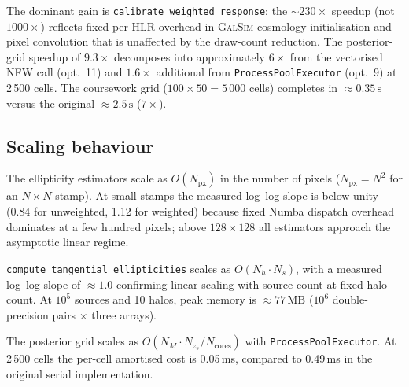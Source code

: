 The dominant gain is \texttt{calibrate\_weighted\_response}: the ${\sim}230\times$
speedup (not $1000\times$) reflects fixed per-HLR overhead in \textsc{GalSim}
cosmology initialisation and pixel convolution that is unaffected by the draw-count
reduction. The posterior-grid speedup of $9.3\times$ decomposes into approximately
$6\times$ from the vectorised NFW call (opt.~11) and $1.6\times$ additional from
\texttt{ProcessPoolExecutor} (opt.~9) at 2\,500 cells. The coursework grid
($100 \times 50 = 5\,000$ cells) completes in ${\approx}0.35\,\mathrm{s}$
versus the original ${\approx}2.5\,\mathrm{s}$ ($7\times$).

\subsection{Scaling behaviour}

The ellipticity estimators scale as $O(N_\mathrm{px})$ in the number of pixels
($N_\mathrm{px} = N^2$ for an $N\times N$ stamp). At small stamps the measured
log--log slope is below unity (0.84 for unweighted, 1.12 for weighted) because
fixed Numba dispatch overhead dominates at a few hundred pixels; above
$128\times128$ all estimators approach the asymptotic linear regime.

\texttt{compute\_tangential\_ellipticities} scales as $O(N_h \cdot N_s)$, with
a measured log--log slope of ${\approx}1.0$ confirming linear scaling with
source count at fixed halo count. At $10^5$ sources and 10 halos, peak
memory is ${\approx}77\,\mathrm{MB}$ ($10^6$ double-precision pairs $\times$
three arrays).

The posterior grid scales as $O(N_M \cdot N_{z_s} / N_\mathrm{cores})$ with
\texttt{ProcessPoolExecutor}. At 2\,500 cells the per-cell amortised cost is
0.05\,ms, compared to 0.49\,ms in the original serial implementation.
